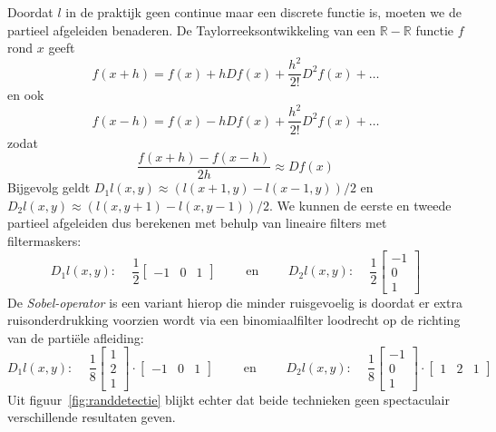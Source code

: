 Doordat $l$ in de praktijk geen continue maar een discrete functie is, moeten we de partieel afgeleiden benaderen.
De Taylorreeksontwikkeling van een $\mathbb{R} - \mathbb{R}$ functie $f$ rond $x$ geeft
$$
f(x+h) = f(x) + h D f(x) + \frac{h^2}{2!} D^2 f(x) + \ldots
$$
en ook
$$
f(x-h) = f(x) - h D f(x) + \frac{h^2}{2!} D^2 f(x) + \ldots
$$
zodat
$$
\frac{f(x+h) - f(x-h)}{2h} \approx D f(x)
$$
Bijgevolg geldt $D_1 l(x,y) \approx (l(x+1,y) - l(x-1,y))/2$ en $D_2 l(x,y) \approx (l(x,y+1) - l(x,y-1))/2$. We
kunnen de eerste en tweede partieel afgeleiden dus berekenen met behulp van lineaire filters met filtermaskers:
$$
D_1 l(x,y)\textrm{: }\quad \frac{1}{2} \left[ \begin{array}{ccc} -1 & 0 & 1 \end{array} \right] \qquad \textrm{ en } 
\qquad D_2 l(x,y)\textrm{: }\quad \frac{1}{2} \left[ \begin{array}{c} -1 \\ 0 \\ 1 \end{array} \right]
$$
De \emph{Sobel-operator} is een variant hierop die minder ruisgevoelig is doordat er 
extra ruisonderdrukking voorzien wordt via een binomiaalfilter loodrecht op de richting 
van de parti\"ele afleiding:
$$
D_1 l(x,y)\textrm{: }\quad \frac{1}{8} \left[ \begin{array}{c} 1 \\ 2 \\ 1 \end{array} \right] \cdot \left[ \begin{array}{ccc} -1 & 0 & 1 \end{array} \right] \qquad \textrm{ en } 
\qquad D_2 l(x,y)\textrm{: }\quad \frac{1}{8} \left[ \begin{array}{c} -1 \\ 0 \\ 1 \end{array} \right] \cdot \left[ \begin{array}{ccc} 1 & 2 & 1 \end{array} \right]
$$
Uit figuur~\ref{fig:randdetectie} blijkt echter dat beide technieken geen spectaculair verschillende 
resultaten geven.

